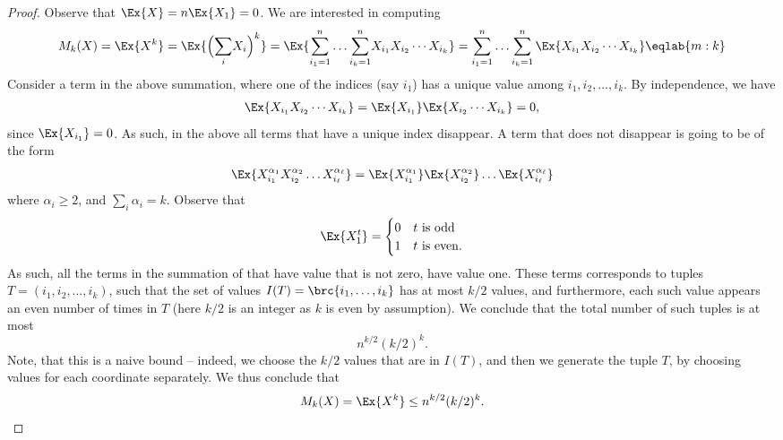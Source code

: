 \begin{proof}
    Observe that $\Ex{X} = n \Ex{X_1} = 0$.  We are interested in
    computing
    \begin{equation}
        M_k(X)%
        =%
        \Ex{  X^{k}}%
        =%
        \Ex{  \Bigl(\smash{\sum_i} X_i \Bigr)^{k}}%
        =%
        \Ex{\Bigl. \smash{\sum_{i_1=1}^n}  \ldots \smash{\sum_{i_k=1}^n}  X_{i_1} X_{i_2} \cdots
           X_{i_k} }%
        =%
        \sum_{i_1=1}^n  \ldots \sum_{i_k=1}^n
        \Ex{X_{i_1} X_{i_2} \cdots
           X_{i_k} }%
        \eqlab{m:k}
    \end{equation}
    Consider a term in the above summation, where one of the indices
    (say $i_1$) has a unique value among $i_1, i_2, \ldots, i_k$. By
    independence, we have
    \begin{align*}
      \Ex{X_{i_1} X_{i_2} \cdots X_{i_k} }
      =
      \Ex{X_{i_1}}\Ex{ X_{i_2} \cdots X_{i_k} } = 0,
    \end{align*}
    since $\Ex{X_{i_1}} = 0$.  As such, in the above all terms that
    have a unique index disappear. A term that does not disappear is
    going to be of the form
    \begin{equation*}
        \Ex{X_{i_1}^{\alpha_1} X_{i_2}^{\alpha_2} \ldots
           X_{i_\ell}^{\alpha_\ell}}
        =%
        \Ex{X_{i_1}^{\alpha_1}}\Ex{ X_{i_2}^{\alpha_2}} \ldots
        \Ex{ X_{i_\ell}^{\alpha_\ell}}
    \end{equation*}
    where $\alpha_i \geq 2$, and $\sum_i \alpha_i = k$. Observe that
    \[
        \Ex{X_1^t} =\begin{cases}
            0 & t \text{ is odd}\\
            1 & t \text{ is even.}
        \end{cases}
    \]
    As such, all the terms in the summation of  that have
    value that is not zero, have value one. These terms corresponds to
    tuples $T = (i_1, i_2, \ldots, i_k)$, such that the set of values
    $I(T) = \brc{ i_1, \ldots, i_k}$ has at most $k/2$ values, and
    furthermore, each such value appears an even number of times in
    $T$ (here $k/2$ is an integer as $k$ is even by assumption). We
    conclude that the total number of such tuples is at most
    \[
        n^{k/2} (k/2)^k.
    \]
    Note, that this is a naive bound -- indeed, we choose the $k/2$
    values that are in $I(T)$, and then we generate the tuple $T$, by
    choosing values for each coordinate separately. We thus conclude
    that
    \begin{equation*}
        M_k(X) = \Ex{  X^{k}}%
        \leq n^{k/2} (k/2)^k.
    \end{equation*}


\end{proof}
